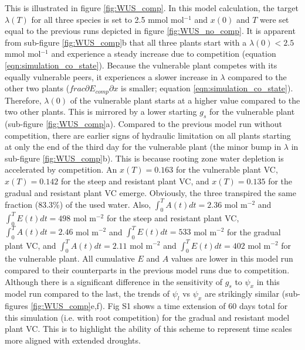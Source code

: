 \documentclass[utf8]{frontiersSCNS} %
\begin{document}
This is illustrated in figure \ref{fig:WUS_comp}. In this model calculation, the target $\lambda(T)$ for all three species is set to 2.5 mmol mol$^{-1}$ and $x(0)$ and $T$ were set equal to the previous runs depicted in figure \ref{fig:WUS_no_comp}. It is apparent from sub-figure \ref{fig:WUS_comp}b that all three plants start with a $\lambda(0) < 2.5$ mmol mol$^{-1}$ and experience a steady increase due to competition (equation \ref{eqn:simulation_co_state}). Because the vulnerable plant competes with its equally vulnerable peers, it experiences a slower increase in $\lambda$ compared to the other two plants ($frac{\partial E_{comp}}{\partial x}$ is smaller; equation \ref{eqn:simulation_co_state}). Therefore, $\lambda(0)$ of the vulnerable plant starts at a higher value compared to the two other plants. This is mirrored by a lower starting $g_s$ for the vulnerable plant (sub-figure \ref{fig:WUS_comp}a). Compared to the previous model run without competition, there are earlier signs of hydraulic limitation on all plants starting at only the end of the third day for the vulnerable plant (the minor bump in $\lambda$ in sub-figure \ref{fig:WUS_comp}b). This is because rooting zone water depletion is accelerated by competition. An $x(T)=0.163$ for the vulnerable plant VC, $x(T)=0.142$ for the steep and resistant plant VC, and $x(T)=0.135$ for the gradual and resistant plant VC emerge. Obviously, the three transpired the same fraction (83.3\%) of the used water. Also, $\int_0^TA(t)dt= 2.36$ mol m$^{-2}$ and $\int_0^TE(t)dt= 498$ mol m$^{-2}$ for the steep and resistant plant VC, $\int_0^TA(t)dt= 2.46$ mol m$^{-2}$ and $\int_0^TE(t)dt= 533$ mol m$^{-2}$ for the gradual plant VC, and $\int_0^TA(t)dt= 2.11$ mol m$^{-2}$ and $\int_0^TE(t)dt= 402$ mol m$^{-2}$ for the vulnerable plant. All cumulative $E$ and $A$ values are lower in this model run compared to their counterparts in the previous model runs due to competition. Although there is a significant difference in the sensitivity of $g_s$ to $\psi_x$ in this model run compared to the last, the trends of $\psi_l$ vs $\psi_x$ are strikingly similar (sub-figures \ref{fig:WUS_comp}e,f). Fig S1 shows a time extension of 60 days total for this simulation (i.e. with root competition) for the gradual and resistant model plant VC. This is to highlight the ability of this scheme to represent time scales more aligned with extended droughts. 
\end{document}
